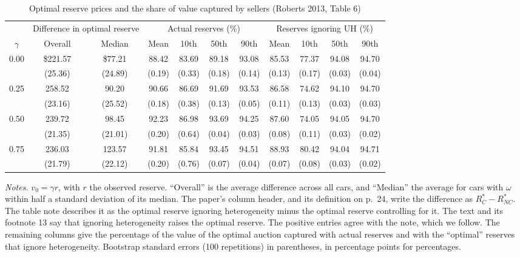 \begin{table}[htbp]
\centering
\caption{Optimal reserve prices and the share of value captured by sellers (Roberts 2013, Table 6)}
\label{tab:15-roberts-reserve}
{\small
\setlength{\tabcolsep}{4pt}
\begin{tabular}{ccccccccccc}
\toprule
 & \multicolumn{2}{c}{Difference in optimal reserve} & \multicolumn{4}{c}{Actual reserves (\%)} & \multicolumn{4}{c}{Reserves ignoring UH (\%)}\\
\cmidrule(lr){2-3}\cmidrule(lr){4-7}\cmidrule(lr){8-11}
$\gamma$ & Overall & Median & Mean & 10th & 50th & 90th & Mean & 10th & 50th & 90th\\
\midrule
0.00 & \$221.57 & \$77.21 & 88.42 & 83.69 & 89.18 & 93.08 & 85.53 & 77.37 & 94.08 & 94.70\\
     & (25.36) & (24.89) & (0.19) & (0.33) & (0.18) & (0.14) & (0.13) & (0.17) & (0.03) & (0.04)\\
0.25 & 258.52 & 90.20 & 90.66 & 86.69 & 91.69 & 93.53 & 86.58 & 74.62 & 94.10 & 94.70\\
     & (23.16) & (25.52) & (0.18) & (0.38) & (0.13) & (0.05) & (0.11) & (0.13) & (0.03) & (0.03)\\
0.50 & 239.72 & 98.45 & 92.23 & 86.98 & 93.69 & 94.25 & 87.60 & 74.05 & 94.05 & 94.70\\
     & (21.35) & (21.01) & (0.20) & (0.64) & (0.04) & (0.03) & (0.08) & (0.11) & (0.03) & (0.02)\\
0.75 & 236.03 & 123.57 & 91.81 & 85.84 & 93.45 & 94.51 & 88.93 & 80.42 & 94.04 & 94.71\\
     & (21.79) & (22.12) & (0.20) & (0.76) & (0.07) & (0.04) & (0.07) & (0.08) & (0.03) & (0.02)\\
\bottomrule
\end{tabular}}

\smallskip
\begin{minipage}{0.93\textwidth}
\footnotesize \textit{Notes.} $v_0=\gamma r$, with $r$ the observed reserve. ``Overall'' is the average
difference across all cars, and ``Median'' the average for cars with $\omega$ within half a standard
deviation of its median. The paper's column header, and its definition on p.~24, write the difference
as $R^*_C-R^*_{NC}$. The table note describes it as the optimal reserve ignoring heterogeneity minus
the optimal reserve controlling for it. The text and its footnote 13 say that ignoring heterogeneity
raises the optimal reserve. The positive entries agree with the note, which we follow. The remaining columns give the percentage of the value of the
optimal auction captured with actual reserves and with the ``optimal'' reserves that ignore
heterogeneity. Bootstrap standard errors (100 repetitions) in parentheses, in percentage points for
percentages.
\end{minipage}
\end{table}

